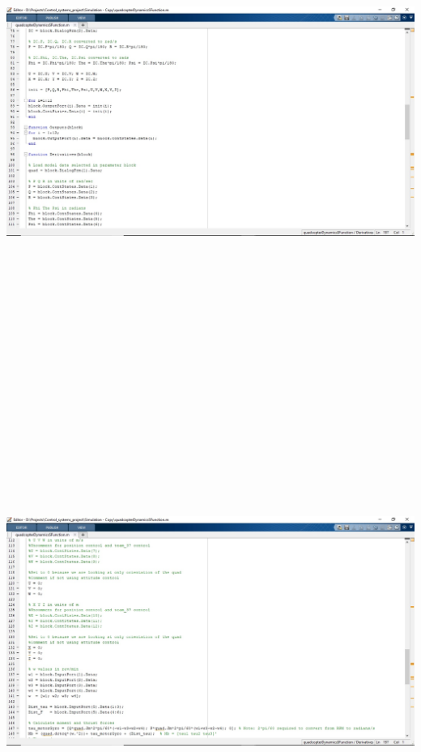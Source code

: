 \documentclass[9pt]{article}
\begin{document}
\begin{flushleft}
\newpage
\includegraphics[width=175mm,height=165mm]{20.jpg}
\newpage
\includegraphics[width=175mm,height=165mm]{21.jpg}

\end{flushleft}
\end{document}
